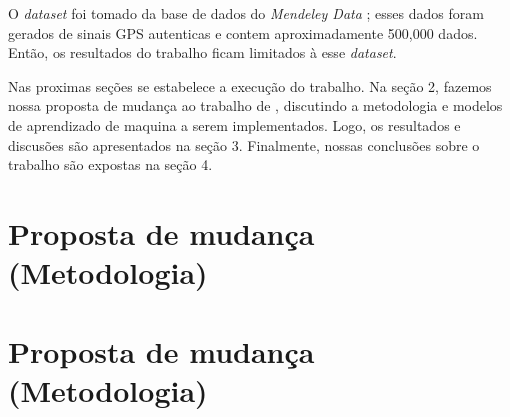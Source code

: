 \documentclass[12pt]{article}
\begin{document}


O \textit{dataset} foi tomado da base de dados do \textit{Mendeley Data} 
\cite{aissou2022dataset}; esses dados foram gerados de sinais GPS autenticas e 
contem aproximadamente 500,000 dados. Então, os resultados do trabalho ficam 
limitados à esse \textit{dataset}.

Nas proximas seções se estabelece a execução do trabalho. Na seção 2, fazemos 
nossa proposta de mudança ao trabalho de \cite{Aissou2021}, discutindo a 
metodologia e modelos de aprendizado de maquina a
serem implementados. Logo, os resultados e 
discusões são apresentados na seção 3. Finalmente, nossas conclusões sobre o 
trabalho são expostas na seção 4.

\section{Proposta de mudança (Metodologia)} %

\lipsum[1-4]



\section{Proposta de mudança (Metodologia)} %



\end{document}
